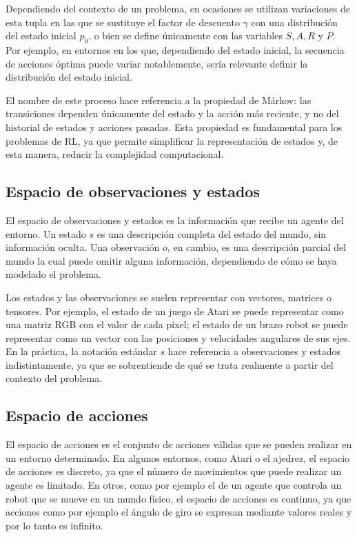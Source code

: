 Dependiendo del contexto de un problema, en ocasiones se utilizan variaciones de esta tupla en las que se sustituye el factor de descuento $\gamma$ con una distribución del estado inicial $p_0$, o bien se define únicamente con las variables $S, A, R$ y  $P$. Por ejemplo, en entornos en los que, dependiendo del estado inicial, la secuencia de acciones óptima puede variar notablemente, sería relevante definir la distribución del estado inicial.

El nombre de este proceso hace referencia a la propiedad de Márkov: las transiciones dependen únicamente del estado y la acción más reciente, y no del historial de estados y acciones pasadas. Esta propiedad es fundamental para los problemas de RL, ya que permite simplificar la representación de estados y, de esta manera, reducir la complejidad computacional.

\subsection{Espacio de observaciones y estados}

El espacio de observaciones y estados es la información que recibe un agente del entorno. Un estado $s$ es una descripción completa del estado del mundo, sin información oculta. Una observación $o$, en cambio, es una descripción parcial del mundo la cual puede omitir alguna información, dependiendo de cómo se haya modelado el problema.

Los estados y las observaciones se suelen representar con vectores, matrices o tensores. Por ejemplo, el estado de un juego de Atari se puede representar como una matriz RGB con el valor de cada píxel; el estado de un brazo robot se puede representar como un vector con las posiciones y velocidades angulares de sus ejes.
En la práctica, la notación estándar $s$ hace referencia a observaciones y estados indistintamente, ya que se sobrentiende de qué se trata realmente a partir del contexto del problema.

\subsection{Espacio de acciones}

El espacio de acciones es el conjunto de acciones válidas que se pueden realizar en un entorno determinado. En algunos entornos, como Atari o el ajedrez, el espacio de acciones es discreto, ya que el número de movimientos que puede realizar un agente es limitado. En otros, como por ejemplo el de un agente que controla un robot que se mueve en un mundo físico, el espacio de acciones es continuo, ya que acciones como por ejemplo el ángulo de giro se expresan mediante valores reales y por lo tanto es infinito.

